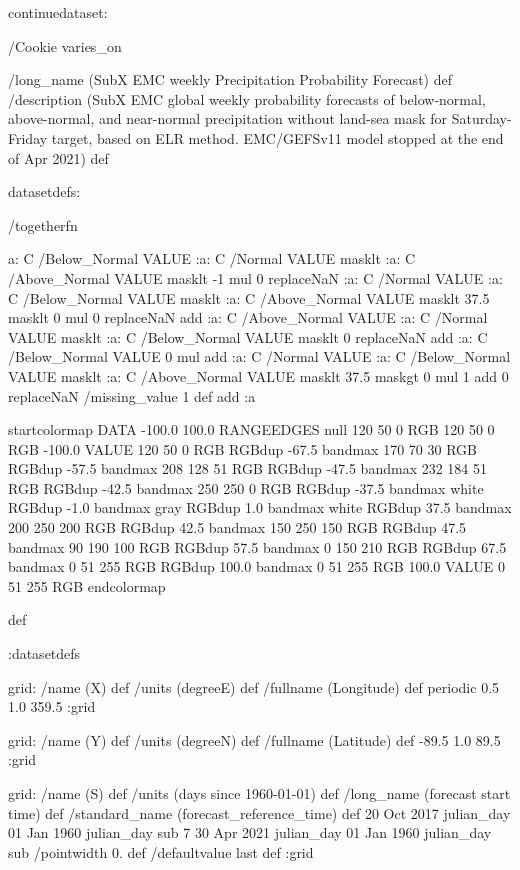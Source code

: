 \begin{ingrid}

continuedataset:


/Cookie varies_on


/long_name (SubX EMC weekly Precipitation Probability Forecast) def
/description (SubX EMC global weekly probability forecasts of below-normal, above-normal, and near-normal precipitation without land-sea mask for Saturday-Friday target, based on ELR method. EMC/GEFSv11 model stopped at the end of Apr 2021) def

datasetdefs:

/togetherfn {
 a:
    C /Below_Normal VALUE
    :a:
     C /Normal VALUE
     masklt
    :a:
     C /Above_Normal VALUE
     masklt
    -1 mul
    0 replaceNaN
    :a:
     C /Normal VALUE
     :a:
      C /Below_Normal VALUE
      masklt
     :a:
      C /Above_Normal VALUE
      masklt
     37.5 masklt
     0 mul
     0 replaceNaN           
     add
    :a:
     C /Above_Normal VALUE
     :a:
      C /Normal VALUE
      masklt
     :a:
      C /Below_Normal VALUE
      masklt
     0 replaceNaN
     add
 :a:
     C /Below_Normal VALUE
     0 mul
     add
    :a:
     C /Normal VALUE
     :a:
      C /Below_Normal VALUE
      masklt
     :a:
      C /Above_Normal VALUE        
      masklt
     37.5 maskgt
     0 mul
     1 add
     0 replaceNaN
     /missing_value 1 def
     add
    :a

startcolormap
DATA -100.0 100.0 RANGEEDGES
null 120 50 0 RGB
120 50 0 RGB -100.0 VALUE
120 50 0 RGB RGBdup -67.5 bandmax
170 70 30 RGB RGBdup -57.5 bandmax
208 128 51 RGB RGBdup -47.5 bandmax
232 184 51 RGB RGBdup -42.5 bandmax
250 250 0 RGB RGBdup -37.5 bandmax
white RGBdup -1.0 bandmax
gray RGBdup 1.0 bandmax
white RGBdup 37.5 bandmax
200 250 200 RGB RGBdup 42.5 bandmax
150 250 150 RGB RGBdup 47.5 bandmax
90 190 100 RGB RGBdup 57.5 bandmax
0 150 210 RGB RGBdup 67.5 bandmax
0 51 255 RGB RGBdup 100.0 bandmax
0 51 255 RGB 100.0 VALUE
0 51 255 RGB
endcolormap
} def 

:datasetdefs


grid:
/name (X) def
/units (degreeE) def
/fullname (Longitude) def
periodic
0.5 1.0 359.5
:grid

grid:
/name (Y) def
/units (degreeN) def
/fullname (Latitude) def
-89.5 1.0 89.5
:grid


grid:
/name (S) def
/units (days since 1960-01-01) def
/long_name (forecast start time) def
/standard_name (forecast_reference_time) def
20 Oct 2017 julian_day 01 Jan 1960 julian_day sub
7
30 Apr 2021 julian_day 01 Jan 1960 julian_day sub
/pointwidth 0. def
/defaultvalue { last } def
:grid


\end{ingrid}
